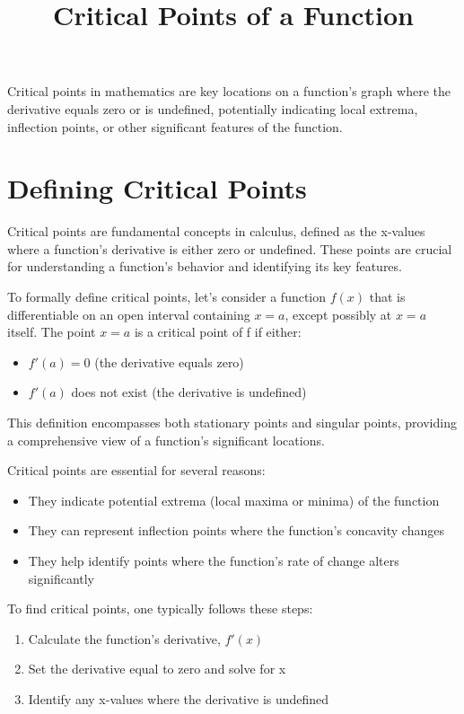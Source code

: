 \documentclass{article}
\title{Critical Points of a Function}
\author{}
\date{}
\begin{document}
\maketitle

Critical points in mathematics are key locations on a function's graph where the derivative equals zero or is undefined, potentially indicating local extrema, inflection points, or other significant features of the function.

\section{Defining Critical Points}

Critical points are fundamental concepts in calculus, defined as the x-values where a function's derivative is either zero or undefined. These points are crucial for understanding a function's behavior and identifying its key features.

To formally define critical points, let's consider a function \(f(x)\) that is differentiable on an open interval containing \(x = a\), except possibly at \(x = a\) itself. The point \(x = a\) is a critical point of f if either:

\begin{itemize}
\item \(f'(a) = 0\) (the derivative equals zero)
\item \(f'(a)\) does not exist (the derivative is undefined)
\end{itemize}

This definition encompasses both stationary points and singular points, providing a comprehensive view of a function's significant locations.

Critical points are essential for several reasons:
\begin{itemize}
\item They indicate potential extrema (local maxima or minima) of the function
\item They can represent inflection points where the function's concavity changes
\item They help identify points where the function's rate of change alters significantly
\end{itemize}

To find critical points, one typically follows these steps:
\begin{enumerate}
\item Calculate the function's derivative, \(f'(x)\)
\item Set the derivative equal to zero and solve for x
\item Identify any x-values where the derivative is undefined
\end{enumerate}
\end{document}
